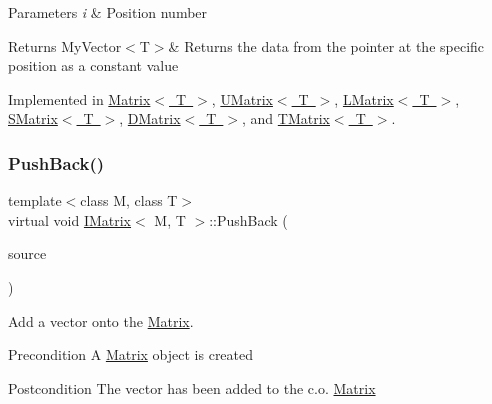 \begin{DoxyParams}{Parameters}
{\em i} & Position number \\
\hline
\end{DoxyParams}
\begin{DoxyReturn}{Returns}
My\+Vector$<$\+T$>$\& Returns the data from the pointer at the specific position as a constant value 
\end{DoxyReturn}


Implemented in \mbox{\hyperlink{class_matrix_a56c7f18f272e74bee2b616eba702fc87}{Matrix$<$ T $>$}}, \mbox{\hyperlink{class_u_matrix_ab0ad5eda96c9a8bb9ca8c69d4bb8d5f8}{U\+Matrix$<$ T $>$}}, \mbox{\hyperlink{class_l_matrix_a56ec5ba9be0bb900ddc0ee7c5283bccd}{L\+Matrix$<$ T $>$}}, \mbox{\hyperlink{class_s_matrix_ac67a58ec51953390848c0728dd070bf8}{S\+Matrix$<$ T $>$}}, \mbox{\hyperlink{class_d_matrix_a2c5cfd854a492586198c69219f31a81d}{D\+Matrix$<$ T $>$}}, and \mbox{\hyperlink{class_t_matrix_a93ab7e799762304bf16da08c30edd413}{T\+Matrix$<$ T $>$}}.

\mbox{\label{class_i_matrix_aa5de147c7aa5b74b0f2177ed1a8158de}} 
\subsubsection{\texorpdfstring{PushBack()}{PushBack()}}
{\footnotesize\ttfamily template$<$class M, class T$>$ \\
virtual void \mbox{\hyperlink{class_i_matrix}{I\+Matrix}}$<$ M, T $>$\+::Push\+Back (\begin{DoxyParamCaption}\item[{const \mbox{\hyperlink{class_my_vector}{My\+Vector}}$<$ T $>$ \&}]{source }\end{DoxyParamCaption})\hspace{0.3cm}{\ttfamily [pure virtual]}}



Add a vector onto the \mbox{\hyperlink{class_matrix}{Matrix}}. 

\begin{DoxyPrecond}{Precondition}
A \mbox{\hyperlink{class_matrix}{Matrix}} object is created 
\end{DoxyPrecond}
\begin{DoxyPostcond}{Postcondition}
The vector has been added to the c.\+o. \mbox{\hyperlink{class_matrix}{Matrix}}
\end{DoxyPostcond}

